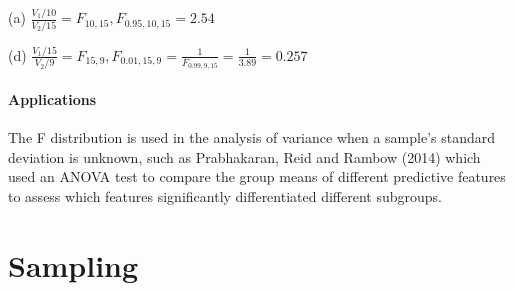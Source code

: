 \documentclass[11pt,letterpaper]{scrartcl}
\begin{document}
(a) $\frac{V_{1} / 10}{V_{2} / 15} = F_{10, 15}, F_{0.95, 10, 15} = 2.54$

(d) $\frac{V_{1} / 15}{V_{2} / 9} = F_{15,9}, F_{0.01, 15, 9} = \frac{1}{F_{0.99, 9, 15}} = \frac{1}{3.89} = 0.257$

\paragraph{Applications}

The F distribution is used in the analysis of variance when a sample's standard deviation is unknown, such as Prabhakaran, Reid and Rambow (2014) which used an ANOVA test to compare the group means of different predictive features to assess which features significantly differentiated different subgroups.

\section{Sampling}
\end{document}
